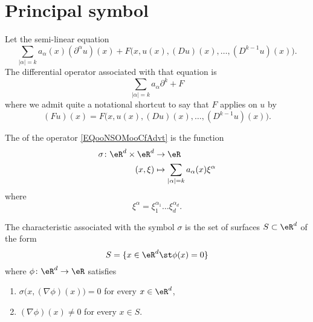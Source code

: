 \section{Principal symbol}

Let the semi-linear equation
\begin{equation}
	\sum_{| \alpha |=k}a_{\alpha}(x)(\partial^{\alpha}u)(x)+F\big( x,u(x),(Du)(x),\ldots,(D^{k-1}u)(x) \big).
\end{equation}
The differential operator associated with that equation is
\begin{equation}       \label{EQooNSOMooCfAdvt}
	\sum_{| \alpha |=k}a_{\alpha}\partial^k +F
\end{equation}
where we admit quite a notational shortcut to say that \( F\) applies on \( u\) by
\begin{equation}
	(Fu)(x)=F  \big( x,u(x),(Du)(x),\ldots,(D^{k-1}u)(x) \big).
\end{equation}

\begin{definition}
	The  of the operator \eqref{EQooNSOMooCfAdvt} is the function
	\begin{equation}
		\begin{aligned}
			\sigma\colon \eR^d\times \eR^d & \to \eR                                              \\
			(x,\xi)                        & \mapsto \sum_{| \alpha |=k}a_{\alpha}(x)\xi^{\alpha}
		\end{aligned}
	\end{equation}
	where
	\begin{equation}
		\xi^{\alpha}=\xi_1^{\alpha_1}\ldots \xi_d^{\alpha_d}.
	\end{equation}
\end{definition}

\begin{definition}
	The characteristic associated with the symbol \( \sigma\) is the set of surfaces \( S\subset \eR^d\) of the form
	\begin{equation}
		S=\{ x\in \eR^d\st \phi(x)=0 \}
	\end{equation}
	where \( \phi\colon \eR^d\to \eR\) satisfies
	\begin{enumerate}
		\item
		      \( \sigma\big( x,(\nabla \phi)(x) \big)=0\) for every \( x\in\eR^d\),
		\item
		      \( (\nabla\phi)(x)\neq 0\) for every \( x\in S\).
	\end{enumerate}
\end{definition}

